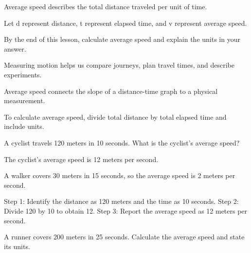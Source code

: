 \documentclass[11pt]{article}
\begin{document}
\begin{conceptbox}
Average speed describes the total distance traveled per unit of time.
\end{conceptbox}

\begin{notationbox}
Let d represent distance, t represent elapsed time, and v represent average speed.
\end{notationbox}

\begin{objectivebox}
By the end of this lesson, calculate average speed and explain the units in your answer.
\end{objectivebox}

\begin{contextbox}
Measuring motion helps us compare journeys, plan travel times, and describe experiments.
\end{contextbox}

\begin{connectionbox}
Average speed connects the slope of a distance-time graph to a physical measurement.
\end{connectionbox}

\begin{summarybox}
To calculate average speed, divide total distance by total elapsed time and include units.
\end{summarybox}

\begin{question}
A cyclist travels 120 meters in 10 seconds. What is the cyclist's average speed?
\end{question}

\begin{answer}
The cyclist's average speed is 12 meters per second.
\end{answer}

\begin{examplebox}
A walker covers 30 meters in 15 seconds, so the average speed is 2 meters per second.
\end{examplebox}

\begin{solutionbox}
Step 1: Identify the distance as 120 meters and the time as 10 seconds.
Step 2: Divide 120 by 10 to obtain 12.
Step 3: Report the average speed as 12 meters per second.
\end{solutionbox}

\begin{practicebox}
A runner covers 200 meters in 25 seconds. Calculate the average speed and state its units.
\end{practicebox}
\end{document}
